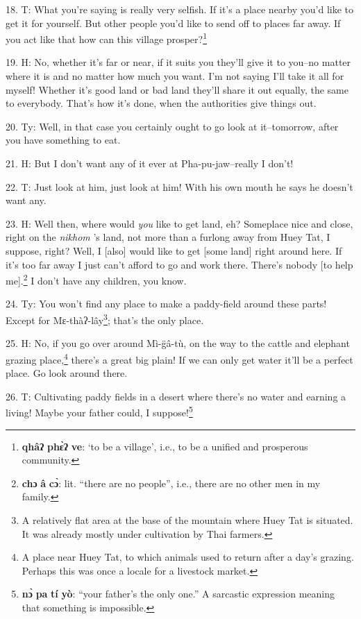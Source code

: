18. T: What you're saying is really very selfish. If it's a place nearby you'd
like to get it for yourself. But other people you'd like to send off to places
far away. If you act like that how can this village prosper?\footnote{\textbf{qhâʔ} \textbf{phɛ̀ʔ} \textbf{ve}: `to be a village', i.e., to be a unified and prosperous community.}

19. H: No, whether it's far or near, if it suits you they'll give it to you--no
matter where it is and no matter how much you want. I'm not saying I'll take it
all for myself! Whether it's good land or bad land they'll share it out equally,
the same to everybody. That's how it's done, when the authorities give things out.

20. Ty: Well, in that case you certainly ought to go look at it--tomorrow,
after you have something to eat.

21. H: But I don't want any of it ever at Pha-pu-jaw--really I don't!

22. T: Just look at him, just look at him! With his own mouth he says he doesn't
want any.

23. H: Well then, where would \textit{you}  like to get land, eh? Someplace nice
and close, right on the \textit{nikhom} 's land, not more than a furlong away
from Huey Tat, I suppose, right? Well, I [also] would like to get [some land] right
around here. If it's too far away I just can't afford to go and work there. There's
nobody [to help me].\footnote{\textbf{chɔ} \textbf{â} \textbf{cɔ̀}: lit. ``there are no people'', i.e., there are no other men in my family.} I don't have any children, you know.

24. Ty: You won't find any place to make a paddy-field around these parts!
Except for Mɛ-thàʔ-lây\footnote{A relatively flat area at the base of the mountain where Huey Tat is situated. It was already mostly under cultivation by Thai farmers.}; that's the only place.

25. H: No, if you go over around Mì-g̈â-tù, on the way to the cattle and elephant
grazing place,\footnote{A place near Huey Tat, to which animals used to return after a day's grazing. Perhaps this was once a locale for a livestock market.} there's a great big plain! If we can only get water it'll be
a perfect place. Go look around there.

26. T: Cultivating paddy fields in a desert where there's no water and earning
a living! Maybe your father could, I suppose!\footnote{\textbf{nɔ̀} \textbf{pa} \textbf{tí} \textbf{yò}: ``your father's the only one.'' A sarcastic expression meaning that something is impossible.}

